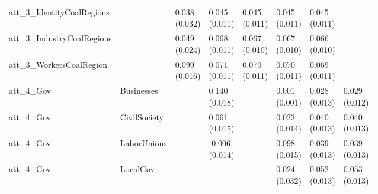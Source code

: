 \begin{tabular}{lllllll}
att_3_IdentityCoalRegions &   & \makecell{ 0.038 \\ (0.032) } & \makecell{ 0.045 \\ (0.011) } & \makecell{ 0.045 \\ (0.011) } & \makecell{ 0.045 \\ (0.011) } & \makecell{ 0.045 \\ (0.011) } \\
att_3_IndustryCoalRegions &   & \makecell{ 0.049 \\ (0.024) } & \makecell{ 0.068 \\ (0.011) } & \makecell{ 0.067 \\ (0.010) } & \makecell{ 0.067 \\ (0.010) } & \makecell{ 0.066 \\ (0.010) } \\
att_3_WorkersCoalRegion &   & \makecell{ 0.099 \\ (0.016) } & \makecell{ 0.071 \\ (0.011) } & \makecell{ 0.070 \\ (0.011) } & \makecell{ 0.070 \\ (0.011) } & \makecell{ 0.069 \\ (0.011) } \\
att_4_Gov&Businesses &   & \makecell{ 0.140 \\ (0.018) } &   & \makecell{ 0.001 \\ (0.001) } & \makecell{ 0.028 \\ (0.013) } & \makecell{ 0.029 \\ (0.012) } \\
att_4_Gov&CivilSociety &   & \makecell{ 0.061 \\ (0.015) } &   & \makecell{ 0.023 \\ (0.014) } & \makecell{ 0.040 \\ (0.013) } & \makecell{ 0.040 \\ (0.013) } \\
att_4_Gov&LaborUnions &   & \makecell{ -0.006 \\ (0.014) } &   & \makecell{ 0.098 \\ (0.015) } & \makecell{ 0.039 \\ (0.013) } & \makecell{ 0.039 \\ (0.013) } \\
att_4_Gov&LocalGov &   &   &   & \makecell{ 0.024 \\ (0.032) } & \makecell{ 0.052 \\ (0.013) } & \makecell{ 0.053 \\ (0.013) } \\

\end{tabular}
